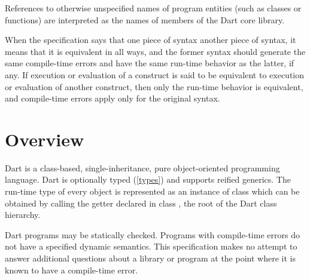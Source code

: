 \documentclass[makeidx]{article}
\begin{document}
\LMHash{}%
References to otherwise unspecified names of program entities (such as classes or functions) are interpreted as the names of members of the Dart core library.


\LMHash{}%
When the specification says that one piece of syntax 
another piece of syntax, it means that it is equivalent in all ways,
and the former syntax should generate the same compile-time errors
and have the same run-time behavior as the latter, if any.
If execution or evaluation of a construct is said to be equivalent to execution or evaluation of another construct, then only the run-time behavior is equivalent, and compile-time errors apply only for the original syntax.


\section{Overview}

\LMHash{}%
Dart is a class-based, single-inheritance, pure object-oriented programming language.
Dart is optionally typed (\ref{types}) and supports reified generics.
The run-time type of every object is represented as an instance of class  which can be obtained by calling the getter  declared in class , the root of the Dart class hierarchy.

\LMHash{}%
Dart programs may be statically checked.
Programs with compile-time errors do not have a specified dynamic semantics.
This specification makes no attempt to answer additional questions
about a library or program at the point
where it is known to have a compile-time error.

\end{document}
